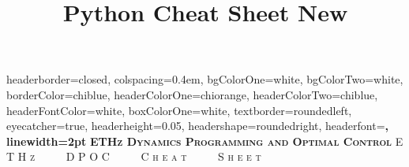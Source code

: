 \documentclass[landscape,a0paper,fontscale=0.285]{baposter} %
\title{Python Cheat Sheet New}
\begin{document}
\begin{poster}
{
headerborder=closed, %
colspacing=0.4em, %
bgColorOne=white, %
bgColorTwo=white, %
borderColor=chiblue, %
headerColorOne=chiorange, %
headerColorTwo=chiblue, %
headerFontColor=white, %
boxColorOne=white, %
textborder=roundedleft, %
eyecatcher=true, %
headerheight=0.05\textheight, %
headershape=roundedright, %
headerfont=\Large\bf\textsc, %
linewidth=2pt %
}
{\bf\textsc{ETHz Dynamics Programming and Optimal Control}\vspace{0.5em}} %
{\textsc{ E T H z \ \ \ \ \  D P O C  \ \ \ \ \ C h e a t \ \ \ \ \ S h e e t \hspace{12pt}}}



\end{poster}
\end{document}
